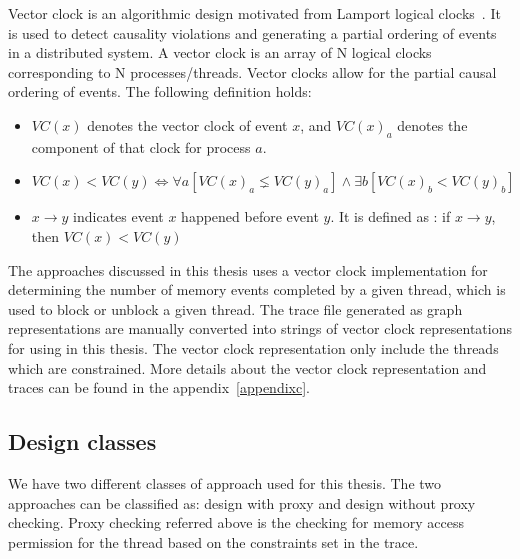 Vector clock is an algorithmic design motivated from Lamport logical clocks~\citep{fidge1991logical}. 
It is used to detect causality violations and generating a partial ordering of events in a distributed system. 
A vector clock is an array of N logical clocks corresponding to N processes/threads. 
Vector clocks allow for the partial causal ordering of events.
The following definition holds:
\begin{itemize}
\item $VC(x)$ denotes the vector clock of event $x$, and $VC(x)_a$ denotes the component of that clock for process $a$. 
\item $VC(x) < VC(y) \iff \forall a[VC(x)_a \lneq VC(y)_a] \wedge \exists b[VC(x)_b < VC(y)_b]$
\item $x \to y$ indicates event $x$ happened before event $y$. It is defined as : if $x \to y$, then $VC(x) < VC(y)$
\end{itemize}

The approaches discussed in this thesis uses a vector clock implementation for determining the number of memory events completed by a given thread, which is used to block or unblock a given thread. 
The trace file generated as graph representations are manually converted into strings of vector clock representations for using in this thesis. 
The vector clock representation only include the threads which are constrained. 
More details about the vector clock representation and traces can be found in the appendix~\ref{appendixc}.


\subsection{Design classes}

We have two different classes of approach used for this thesis. 
The two approaches can be classified as: design with proxy and design without proxy checking. 
Proxy checking referred above is the checking for memory  access permission for the thread based on the constraints set in the trace. 

